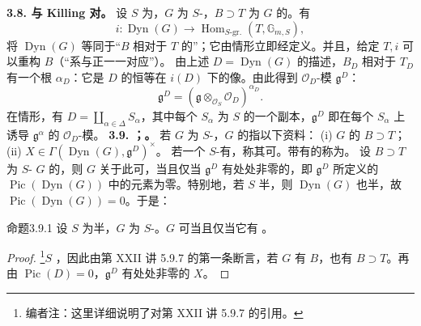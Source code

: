 \textbf{3.8. 与 Killing 对。} 设 $S$ 为，$G$ 为 $S$-，$B\supset T$ 为 $G$ 的。有
\[i:\operatorname{Dyn}(G)\longrightarrow\operatorname{Hom}_{S\text{-gr.}}(T,\mathbb G_{m,S}),\]
将 $\operatorname{Dyn}(G)$ 等同于“$B$ 相对于 $T$ 的”；它由情形立即经定义。并且，给定 $T,i$ 可以重构 $B$（“系与正一一对应”）。
由上述 $D=\operatorname{Dyn}(G)$ 的描述，$B_D$ 相对于 $T_D$ 有一个根 $\alpha_D$：它是 $D$ 的恒等在 $i(D)$ 下的像。由此得到 $\mathcal O_D$-模 $\mathfrak g^D$：
\[\mathfrak g^D=(\mathfrak g\otimes_{\mathcal O_S}\mathcal O_D)^{\alpha_D}.\]
在情形，有 $D=\coprod_{\alpha\in\Delta}S_\alpha$，其中每个 $S_\alpha$ 为 $S$ 的一个副本，$\mathfrak g^D$ 即在每个 $S_\alpha$ 上诱导 $\mathfrak g^\alpha$ 的 $\mathcal O_D$-模。
\textbf{3.9. ；。} 若 $G$ 为 $S$-，$G$ 的指以下资料：
(i) $G$ 的 $B\supset T$；
(ii)  $X\in\Gamma(\operatorname{Dyn}(G),\mathfrak g^D)^\times$。
若一个 $S$-有，称其可。带有的称为。
设 $B\supset T$ 为 $S$- $G$ 的，则 $G$ 关于此可，当且仅当 $\mathfrak g^D$ 有处处非零的，即 $\mathfrak g^D$ 所定义的 $\operatorname{Pic}(\operatorname{Dyn}(G))$ 中的元素为零。特别地，若 $S$ 半，则 $\operatorname{Dyn}(G)$ 也半，故 $\operatorname{Pic}(\operatorname{Dyn}(G))=0$。于是：
\begin{SGAresult}{命题}{3.9.1}
设 $S$ 为半，$G$ 为 $S$-。$G$ 可当且仅当它有 。
\end{SGAresult}
\begin{proof}
\footnote[14]{编者注：这里详细说明了对第 XXII 讲 5.9.7 的引用。}$S$ ，因此由第 XXII 讲 5.9.7 的第一条断言，若 $G$ 有  $B$，也有 $B\supset T$。再由 $\operatorname{Pic}(D)=0$，$\mathfrak g^D$ 有处处非零的 $X$。
\end{proof}
